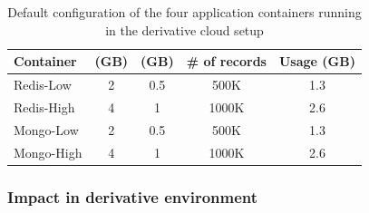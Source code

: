       \begin{table}[t]
	  \begin{center}	   
	    \begin{tabular}{| l | c | c | c | c |}
	      \hline
	      Container & \hl{} (GB) & \sol{} (GB) & \# of records & Usage (GB)  \\ 
	      \hline
	      \hline
	      Redis-Low & 2 & 0.5 & 500K & 1.3 \\  
	      \hline
	      Redis-High & 4 & 1 & 1000K & 2.6 \\  
	      \hline
	      Mongo-Low & 2 & 0.5 & 500K & 1.3 \\
	      \hline
	      Mongo-High & 4 & 1 & 1000K & 2.6 \\
	      \hline
	    \end{tabular}	  
	  \end{center}
	  \caption{Default configuration of the four application containers running in the derivative cloud setup}
	  \label{tbl:table_default_config}	  
	\end{table}
    
     \subsubsection{Impact in derivative environment}
     \label{sec:drawback_env}
	
